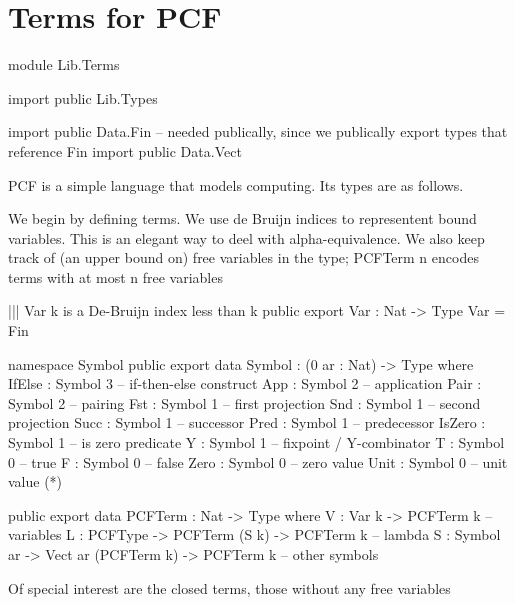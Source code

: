 \section{Terms for PCF}

\begin{hidden}
module Lib.Terms

import public Lib.Types

import public Data.Fin  -- needed publically, since we publically export types that reference Fin
import public Data.Vect

\end{hidden}

PCF is a simple language that models computing. Its types are as follows.


We begin by defining terms. We use de Bruijn indices to representent bound
variables. This is an elegant way to deel with alpha-equivalence.
We also keep track of (an upper bound on) free variables in the type;
PCFTerm n encodes terms with at most n free variables

\begin{code}
||| Var k is a De-Bruijn index less than k
public export
Var : Nat -> Type
Var = Fin

namespace Symbol
  public export
  data Symbol : (0 ar : Nat) -> Type where
    IfElse : Symbol 3       -- if-then-else construct
    App    : Symbol 2       -- application
    Pair   : Symbol 2       -- pairing
    Fst    : Symbol 1       -- first projection
    Snd    : Symbol 1       -- second projection
    Succ   : Symbol 1       -- successor
    Pred   : Symbol 1       -- predecessor
    IsZero : Symbol 1       -- is zero predicate
    Y      : Symbol 1       -- fixpoint / Y-combinator
    T      : Symbol 0       -- true
    F      : Symbol 0       -- false
    Zero   : Symbol 0       -- zero value
    Unit   : Symbol 0       -- unit value (*)
\end{code}

\begin{code}
public export
data PCFTerm : Nat -> Type where
  V    : Var k -> PCFTerm k                             -- variables
  L    : PCFType   -> PCFTerm (S k) -> PCFTerm k        -- lambda
  S    : Symbol ar -> Vect ar (PCFTerm k) -> PCFTerm k  -- other symbols
\end{code}

Of special interest are the closed terms, those without any free variables

